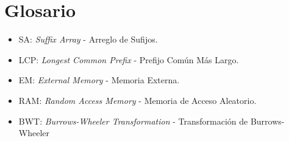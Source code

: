 \chapter*{Glosario}

\begin{itemize}

\item SA: \textit{Suffix Array} - Arreglo de Sufijos.
\item LCP: \textit{Longest Common Prefix} - Prefijo Común Más Largo.
\item EM: \textit{External Memory} - Memoria Externa.
\item RAM: \textit{Random Access Memory} - Memoria de Acceso Aleatorio.
\item BWT: \textit{Burrows-Wheeler Transformation} -  Transformación de Burrows-Wheeler

\end{itemize}
